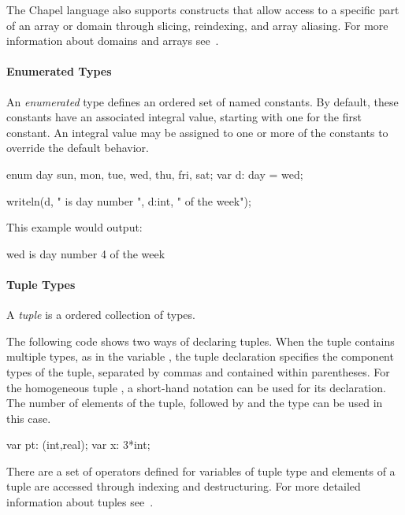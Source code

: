 The Chapel language also supports constructs that allow 
access to a specific part of an array or domain through slicing,
reindexing, and array aliasing.   For more information about 
domains and arrays see~.
 
\paragraph{Enumerated Types}
An \emph{enumerated} type defines an ordered set of named constants.
By default, these constants have an associated 
integral value, starting with one for the first constant. 
An integral value may be assigned to one or more of the constants
to override the default behavior. 

\begin{example}
\begin{chapel}
enum day {sun, mon, tue, wed, thu, fri, sat};
var d: day = wed;

writeln(d, " is day number ", d:int, " of the week");
\end{chapel}

This example would output:
\begin{commandline}
wed is day number 4 of the week
\end{commandline}
\end{example}

\paragraph{Tuple Types}
A \emph{tuple} is a ordered collection of types.
\begin{example}
The following code shows two ways of declaring tuples.
When the tuple contains multiple types, as in the variable
, the tuple declaration specifies the component
types of the tuple, separated by commas and contained within
parentheses.  For the homogeneous tuple , a short-hand
notation can be used for its declaration.  The number of elements
of the tuple, followed by \chpl{*} and the type can be used in
this case.

\begin{chapel}
var pt: (int,real);
var x: 3*int;
\end{chapel}
\end{example}

There are a set of operators defined for variables of tuple type
and elements of a tuple are accessed through indexing and destructuring.  
For more detailed information about tuples see~.

